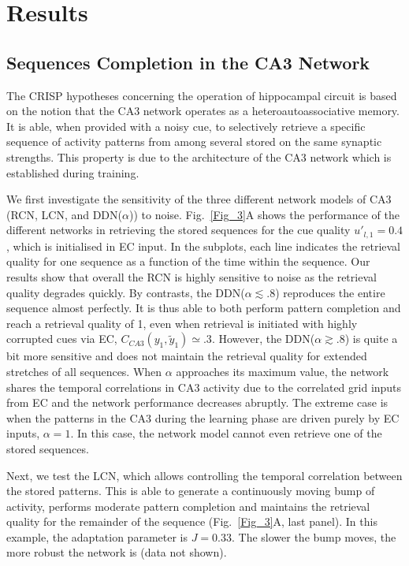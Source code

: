\documentclass[utf8]{frontiersSCNS} %
\begin{document}
\section{Results}
\subsection{Sequences Completion in the CA3 Network}

The CRISP hypotheses concerning the operation of hippocampal circuit is based on the notion that the CA3 network operates as a heteroautoassociative memory. It is able, when provided with a noisy cue, to selectively retrieve a specific sequence of activity patterns from among several stored on the same synaptic strengths. This property is due to the architecture of the CA3 network which is established during training. 

We first investigate the sensitivity of the three different network models of CA3 (RCN, LCN, and DDN($\alpha$)) to noise. Fig.~\ref{Fig_3}A shows the performance of the different networks in retrieving the stored sequences for the cue quality $u'_{l, 1} = 0.4$, which is initialised in EC input. In the subplots, each line indicates the retrieval quality for one sequence as a function of the time within the sequence. Our results show that overall the RCN is highly sensitive to noise as the retrieval quality degrades quickly.  
By contrasts, the DDN($\alpha \lesssim .8$) reproduces the entire sequence almost perfectly. It is thus able to both perform pattern completion and reach a retrieval quality of 1, even when retrieval is initiated with highly corrupted cues via EC, $C_{CA3} (y_1, \tilde{y}_1) \simeq .3 $. 
However, the DDN($\alpha \gtrsim .8$) is quite a bit more sensitive and does not maintain the retrieval quality for extended stretches of all sequences. When $\alpha$ approaches its maximum value, the network shares the temporal correlations in CA3 activity due to the correlated grid inputs from EC and the network performance decreases abruptly. The extreme case is when the patterns in the CA3 during the learning phase are driven purely by EC inputs, $\alpha = 1$. In this case, the network model cannot even retrieve one of the stored sequences.
% 

Next, we test the LCN, which allows controlling the temporal correlation between the stored patterns. This is able to generate a continuously moving bump of activity, performs moderate pattern completion and maintains the retrieval quality for the remainder of the sequence (Fig.~\ref{Fig_3}A, last panel).
In this example, the adaptation parameter is $J = 0.33$. The slower the bump moves, the more robust the network is (data not shown).
 
\end{document}
